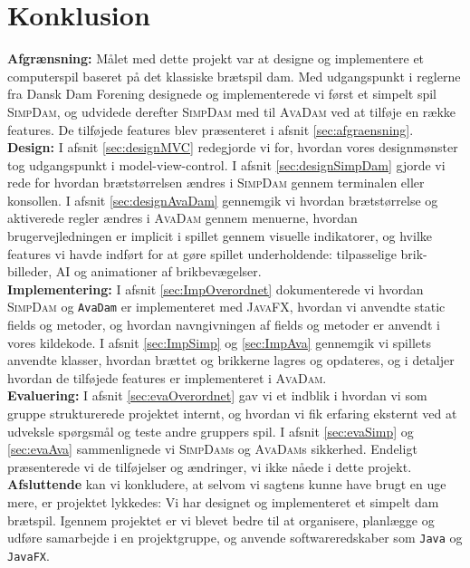 \section{Konklusion}
\textbf{Afgrænsning:} Målet med dette projekt var at designe og implementere et computerspil baseret på det klassiske brætspil dam. Med udgangspunkt i reglerne fra Dansk Dam Forening designede og implementerede vi først et simpelt spil \textsc{SimpDam}, og udvidede derefter \textsc{SimpDam} med til \textsc{AvaDam} ved at tilføje en række features. De tilføjede features blev præsenteret i afsnit \ref{sec:afgraensning}.\\

\textbf{Design:} I afsnit \ref{sec:designMVC} redegjorde vi for, hvordan vores designmønster tog udgangspunkt i model-view-control. I afsnit \ref{sec:designSimpDam} gjorde vi rede for hvordan brætstørrelsen ændres i \textsc{SimpDam} gennem terminalen eller konsollen. I afsnit \ref{sec:designAvaDam} gennemgik vi hvordan brætstørrelse og aktiverede regler ændres i \textsc{AvaDam} gennem menuerne, hvordan brugervejledningen er implicit i spillet gennem visuelle indikatorer, og hvilke features vi havde indført for at gøre spillet underholdende: tilpasselige brik-billeder, AI og animationer af brikbevægelser. \\

\textbf{Implementering:} I afsnit \ref{sec:ImpOverordnet} dokumenterede vi hvordan \textsc{SimpDam} og \texttt{AvaDam} er implementeret med \textsc{JavaFX}, hvordan vi anvendte static fields og metoder, og hvordan navngivningen af fields og metoder er anvendt i vores kildekode. 
I afsnit \ref{sec:ImpSimp} og \ref{sec:ImpAva} gennemgik vi spillets anvendte klasser, hvordan brættet og brikkerne lagres og opdateres, og i detaljer hvordan de tilføjede features er implementeret i \textsc{AvaDam}.\\

\textbf{Evaluering:} I afsnit \ref{sec:evaOverordnet} gav vi et indblik i hvordan vi som gruppe strukturerede projektet internt, og hvordan vi fik erfaring eksternt ved at udveksle spørgsmål og teste andre gruppers spil. I afsnit \ref{sec:evaSimp} og \ref{sec:evaAva} sammenlignede vi \textsc{SimpDam}s og \textsc{AvaDam}s sikkerhed.  Endeligt præsenterede vi de tilføjelser og ændringer, vi ikke nåede i dette projekt. \\

\textbf{Afsluttende} kan vi konkludere, at selvom vi sagtens kunne have brugt en uge mere, er projektet  lykkedes: Vi  har designet og implementeret et simpelt dam brætspil. Igennem projektet er vi blevet bedre til at organisere, planlægge og udføre samarbejde i en projektgruppe, og anvende softwareredskaber som \texttt{Java} og \texttt{JavaFX}.
